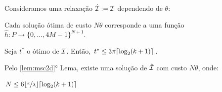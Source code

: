 \begin{frame}{}
    Consideramos uma relaxação ${\hat {\mathcal{I}}:= \mathcal{I}}$ dependendo de $\theta$:
    
    \bigskip
    \begin{minipage}{\linewidth}
        \centering
    \end{minipage}
\end{frame}

\begin{frame}{}
    \begin{obs}
        Cada solução ótima de custo $N \theta$ corresponde a uma função \mbox{$\hat h\colon P \to \{0, \dots, 4M-1\}^{N+1}$}.
    \end{obs}
\end{frame}

\begin{frame}{}
    \begin{lem}
        \label{lem:msc2d}
        Seja $t^*$ o ótimo de $\mathcal{I}$. Então, $t^* \leq 3\pi\lceil\log_2(k+1)\rceil$.
    \end{lem}
\end{frame}

\begin{frame}{}
    Pelo \ref{lem:msc2d}° Lema, existe uma solução de $\hat {\mathcal{I}}$ com custo $N \theta$, onde:

    \bigskip
    \centering
    $N \leq 6\lfloor\nicefrac{\pi}{\lambda}\rfloor \lceil\log_2(k+1)\rceil$
\end{frame}

